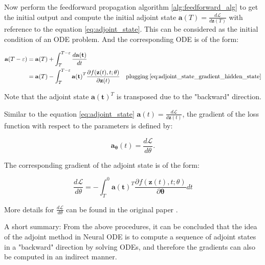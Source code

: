 \documentclass[
	parskip, 			   %
	twoside, 			   %
	DIV=14, 			   %
	BCOR=15.0mm, 		   %
	headsepline, 		   %
	open=right, 		   %
	captions=tableheading, %
	bibliography=totoc,    %
	numbers=noenddot       %
]{scrreprt}
\begin{document}
Now perform the feedforward propagation algorithm \ref{alg:feedforward_alg}  to get the initial output and compute the initial adjoint state $\mathbf{a}(T) = \frac{d\mathcal{L}}{d\mathbf{z}(T)}$ with reference to the equation \ref{eq:adjoint_state}. This can be considered as the initial condition of an ODE problem. And the corresponding ODE is of the form:

\begin{equation}
    \label{eq:adjoint_state_ODE}
    \begin{aligned}
    \mathbf{a}(T-\varepsilon) &= \mathbf{a}(T) + \int_{T}^{T-\varepsilon} \frac{d\mathbf{a(t)}}{dt} \\
    &= \mathbf{a}(T) - \int_{T}^{T-\varepsilon} \mathbf{a(t)}^T \frac{\partial f(\mathbf{z}(t), t; \theta)}{\partial \mathbf{z}(t)} \quad \text{plugging} \: \ref{eq:adjoint_state_gradient_hidden_state} \\ 
    \end{aligned}
\end{equation}

Note that the adjoint state $\mathbf{a(t)}^T$ is transposed due to the "backward" direction.

Similar to the equation \ref{eq:adjoint_state} $\mathbf{a}(t) = \frac{d\mathcal{L}}{d\mathbf{z}(t)}$, the gradient of the loss function with respect to the parameters is defined by:

\begin{equation}
    \label{eq:adjoint_state_parameters}
    \mathbf{a_\theta}(t) = \frac{d\mathcal{L}}{d\theta}.
\end{equation}

The corresponding gradient of the adjoint state is of the form:

\begin{equation}
    \label{eq:adjoint_state_gradient_parameters}
    \frac{d\mathcal{L}}{d\theta} = - \int_{T}^{0} \mathbf{a(t)}^T \frac{\partial f(\mathbf{z}(t), t; \theta)}{\partial \mathbf{\theta}} dt
\end{equation}


More details for $\frac{d\mathcal{L}}{d\theta}$ can be found in the original paper \cite{chen2018neural}.

A short summary: From the above procedures, it can be concluded that the idea of the adjoint method in Neural ODE is to compute a sequence of adjoint states in a "backward" direction by solving ODEs, and therefore the gradients can also be computed in an indirect manner.
\end{document}
